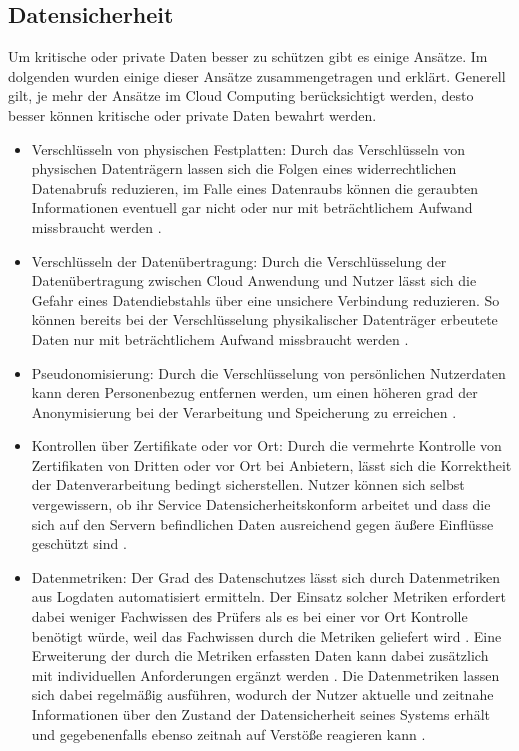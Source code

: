 \subsection{Datensicherheit} 
Um kritische oder private Daten besser zu schützen gibt es einige Ansätze. Im dolgenden wurden einige dieser Ansätze zusammengetragen und erklärt. Generell gilt, je mehr der Ansätze im Cloud Computing berücksichtigt werden, desto besser können kritische oder private Daten bewahrt werden.
\begin{itemize}
\item
Verschlüsseln von physischen Festplatten: Durch das Verschlüsseln von physischen Datenträgern lassen sich die Folgen eines widerrechtlichen Datenabrufs reduzieren, im Falle eines Datenraubs können die geraubten Informationen eventuell gar nicht oder nur mit beträchtlichem Aufwand missbraucht werden \cite{selzer2020}.
\item
Verschlüsseln der Datenübertragung: Durch die Verschlüsselung der Datenübertragung zwischen Cloud Anwendung und Nutzer lässt sich die Gefahr eines Datendiebstahls über eine unsichere Verbindung reduzieren. So können bereits bei der Verschlüsselung physikalischer Datenträger erbeutete Daten nur mit beträchtlichem Aufwand missbraucht werden \cite{selzer2020}.
\item
Pseudonomisierung: Durch die Verschlüsselung von persönlichen Nutzerdaten kann deren  Personenbezug entfernen werden, um einen höheren grad der Anonymisierung bei der Verarbeitung und Speicherung zu erreichen \cite{selzer2020}.
\item
Kontrollen über Zertifikate oder vor Ort: Durch die vermehrte Kontrolle von Zertifikaten von Dritten oder vor Ort bei Anbietern, lässt sich die Korrektheit der Datenverarbeitung bedingt sicherstellen. Nutzer können sich selbst vergewissern, ob ihr Service Datensicherheitskonform arbeitet und dass die sich auf den Servern befindlichen Daten ausreichend gegen äußere Einflüsse geschützt sind \cite{selzer2020}. 
\item 
Datenmetriken: Der Grad des Datenschutzes lässt sich durch Datenmetriken aus Logdaten automatisiert ermitteln. Der Einsatz solcher Metriken erfordert dabei weniger Fachwissen des Prüfers als es bei einer vor Ort Kontrolle benötigt würde, weil das Fachwissen durch die Metriken geliefert wird \cite{selzer2020}. Eine Erweiterung der durch die Metriken erfassten Daten kann dabei zusätzlich mit individuellen Anforderungen ergänzt werden \cite{selzer2020}. Die Datenmetriken lassen sich dabei regelmäßig ausführen, wodurch der Nutzer aktuelle und zeitnahe Informationen über den Zustand der Datensicherheit seines Systems erhält und gegebenenfalls ebenso zeitnah auf Verstöße reagieren kann \cite{selzer2020}.

\end{itemize}
